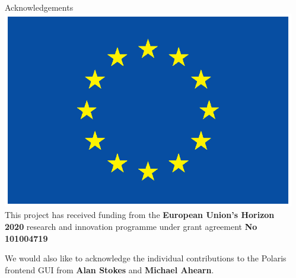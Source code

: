 \documentclass[final]{beamer}
\newlength{\sepwidth}
\newlength{\colwidth}
\newcommand{\separatorcolumn}{\begin{column}{\sepwidth}\end{column}}
\begin{document}
\begin{frame}[t]
\begin{columns}[t]
\begin{column}{\colwidth}
                \begin{block}{Acknowledgements}
                    \includegraphics[height=\baselineskip]{logos/EU_flag_yellow_eps}
                    This project has received funding from the \textbf{European Union’s Horizon 2020} research and
                    innovation programme under grant agreement \textbf{No 101004719}

                    We would also like to acknowledge the individual contributions to the Polaris frontend
                    GUI from \textbf{Alan Stokes} and \textbf{Michael Ahearn}.
                \end{block}





            \end{column}
            \separatorcolumn
        \end{columns}

    \end{frame}
\end{document}
